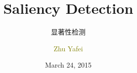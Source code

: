 \documentclass[notheorems,serif,table,compress]{beamer}  %
\begin{document}
\title{Saliency Detection}
\subtitle{显著性检测}
\author[]{\textcolor{olive}{Zhu Yafei}}
\date[March 24, 2015]{March 24, 2015}
\frame{ \titlepage }
\def\hilite<#1>{\temporal<#1>{\color{blue!15}}{\color{black}}{\color{black}}}
\newcommand{\shadow}[2][purple]{\hskip5pt\shadowbox{\color{#1}\small \kai #2\vspace{3mm}}}
\newcommand{\colorrbox}[2][purple]{\doublebox{\color{#1}\small \kai#2}}

\end{document}
